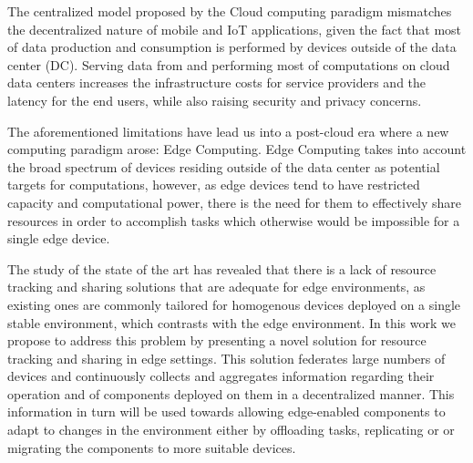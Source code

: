 

The centralized model proposed by the Cloud computing paradigm mismatches the decentralized nature of mobile and IoT applications, given the fact that most of data production and consumption is performed by devices outside of the data center (DC). Serving data from and performing most of computations on cloud data centers increases the infrastructure costs for service providers and the latency for the end users, while also raising security and privacy concerns. 

The aforementioned limitations have lead us into a post-cloud era where a new computing paradigm arose: Edge Computing. Edge Computing takes into account the broad spectrum of devices residing outside of the data center as potential targets for computations, however, as edge devices tend to have restricted capacity and computational power, there is the need for them to effectively share resources in order to accomplish tasks which otherwise would be impossible for a single edge device. 

The study of the state of the art has revealed that there is a lack of resource tracking and sharing solutions that are adequate for edge environments, as existing ones are commonly tailored for homogenous devices deployed on a single stable environment, which contrasts with the edge environment. In this work we propose to address this problem by presenting a novel solution for resource tracking and sharing in edge settings. This solution federates large numbers of devices and continuously collects and aggregates information regarding their operation and of components deployed on them in a decentralized manner. This information in turn will be used towards allowing edge-enabled components to adapt to changes in the environment either by offloading tasks, replicating or or migrating the components to more suitable devices. 